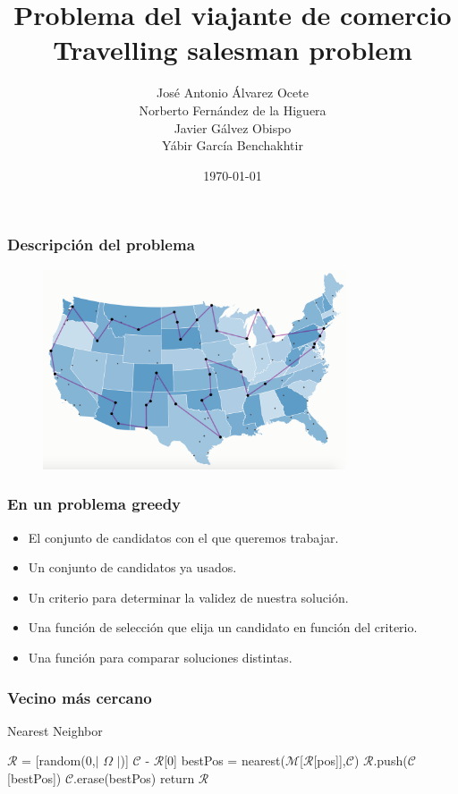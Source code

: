 \documentclass[spanish]{beamer}
\title{Problema del viajante de comercio\\
Travelling salesman problem}
\date{\today}
\author{José Antonio Álvarez Ocete \\ Norberto Fernández de la Higuera \\ Javier Gálvez Obispo \\ Yábir García Benchakhtir}
\institute{Doble Grado en Ingeniería Informática y Matemáticas}
\begin{document}
\frame{\titlepage}

\begin{frame}\frametitle{Descripción del problema}

  \begin{figure}[H]
    \centering
    \includegraphics[width=0.8\textwidth]{mapa.png}
  \end{figure}
  
\end{frame}

\begin{frame}\frametitle{En un problema greedy}
  \begin{itemize}
  \item El conjunto de candidatos con el que queremos trabajar.
  \item Un conjunto de candidatos ya usados.
  \item Un criterio para determinar la validez de nuestra solución.
  \item Una función de selección que elija un candidato en función del criterio.
  \item Una función para comparar soluciones distintas.
  \end{itemize}
\end{frame}

\begin{frame}\frametitle{Vecino más cercano}
  
  \begin{algorithm}[H]
    \caption{Nearest Neighbor}
    \begin{algorithmic}
      \State $\mathcal{R}$ = [random(0,$|$ $\Omega$ $|$)]
      \State $\mathcal{C}$ - $\mathcal{R}$[0]
      \State bestPos = nearest($\mathcal{M}$[$\mathcal{R}$[pos]],$\mathcal{C}$)
      \State $\mathcal{R}$.push($\mathcal{C}$[bestPos])
      \State $\mathcal{C}$.erase(bestPos)
      \EndFor
      \State return $\mathcal{R}$
    \end{algorithmic}
  \end{algorithm}

\end{frame}
\end{document}

